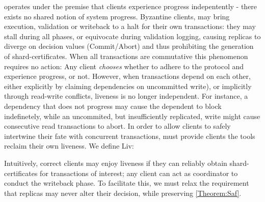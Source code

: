 \sys operates under the premise that clients experience progress indepentently - there exists no shared notion of system progress. Byzantine clients, may bring execution, validation or writeback to a halt for their own transactions: they may stall during all phases, or equivocate during validation logging, causing replicas to diverge on decision values (Commit/Abort) and thus prohibiting the generation of shard-certificates. When all transactions are commutative this phenomenon requires no action: Any client \textit{chooses} whether to adhere to the protocol and experience progress, or not. However, when transactions depend on each other, either explicitly by claiming dependencies on uncommitted write), or implicitly through read-write conflicts, liveness is no longer independent. For instance, a dependency that does not progress may cause the dependent to block indefinetely, while an uncommited, but insufficiently replicated, write might cause consecutive read transactions to abort.
In order to allow clients to safely intertwine their fate with concurrent transactions, \sys must provide clients the tools reclaim their own liveness. We define Liv: 
\begin{theorem}[Liv] 
\end{theorem}


Intuitively, correct clients may enjoy liveness if they can reliably obtain shard-certificates for transactions of interest; any client can act as coordinator to conduct the writeback phase. To facilitate this, we must relax the requirement that replicas may never alter their decision, while preserving \ref{Theorem:Saf}.

